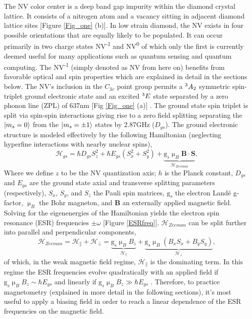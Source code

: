 The NV color center is a deep band gap impurity within the diamond crystal lattice. It consists of a nitrogen atom and a vacancy sitting in adjacent diamond lattice sites [Figure \ref{Fig_one} (b)]. In low strain diamond, the NV exists in four possible orientations that are equally likely to be populated. It can occur primarily in two charge states NV\textsuperscript{-1} and NV\textsuperscript{0} of which only the first is currently deemed useful for many applications such as quantum sensing and quantum computing. The NV\textsuperscript{-1} (simply denoted as NV from here on) benefits from favorable optical and spin properties which are explained in detail in the sections below. The NV's inclusion in the $C_{3v}$ point group permits a $\textsuperscript{3}A_2$ symmetric spin-triplet ground electronic state and an excited $\textsuperscript{3}E$ state separated by a zero phonon line (ZPL) of 637nm [Fig \ref{Fig_one} (a)] \cite{maze2011properties}. The ground state spin triplet is split via spin-spin interactions giving rise to a zero field splitting separating the $\ket{m_s = 0}$ from the $\ket{m_s = \pm 1}$ states by 2.87GHz ($D_{gs}$). 
The ground electronic structure is modeled effectively by the following Hamiltonian (neglecting hyperfine interactions with nearby nuclear spins),
\begin{equation}\label{hamiltonian}
\mathcal{H}_{gs} = \hbar D_{gs}S_z^2+\hbar E_{gs}(S_x^2+S_y^2)+\underbrace{\text{g}_s \upmu_B\textbf{B}\cdot\textbf{S}}_{\mathcal{H}_{Zeeman}}, 
\end{equation}
Where we define $z$ to be the NV quantization axis; $h$ is the Planck constant, $D_{gs}$ and $E_{gs}$ are the ground state axial and transverse splitting parameters (respectively), $S_x$, $S_y$, and $S_z$ the Pauli spin matrices, $\text{g}_s$ the electron Land\'e g-factor, $\upmu_B$ the Bohr magneton, and $\textbf{B}$ an externally applied magnetic field. Solving for the eigenenergies of the Hamiltonian yields the electron spin resonance (ESR) frequencies $\pm \omega$ [Figure \ref{ESRfreq}]. $\mathcal{H}_{Zeeman}$ can be split further into parallel and perpendicular components,
\begin{equation}
\mathcal{H}_{Zeeman} = \mathcal{H}_{\parallel} + \mathcal{H}_{\perp} = \underbrace{\text{g}_s \upmu_{B}B_{z}}_{\mathcal{H}_{\parallel}} + \underbrace{\text{g}_s \upmu_B(B_x S_x + B_y S_y)}_{\mathcal{H}_{\perp}},
\end{equation}
of which, in the weak magnetic field regime, $\mathcal{H}_{\parallel}$ is the dominating term. In this regime the ESR frequencies evolve quadratically with an applied field if $\text{g}_s \upmu_B B_z \sim \hbar E_{gs}$ and linearly if $\text{g}_s \upmu_B B_z \gg \hbar E_{gs}$ \cite{rondin2014magnetometry}. Therefore, to practice magnetometry (explained in more detail in the following sections), it's most useful to apply a biasing field in order to reach a linear dependence of the ESR frequencies on the magnetic field. 


